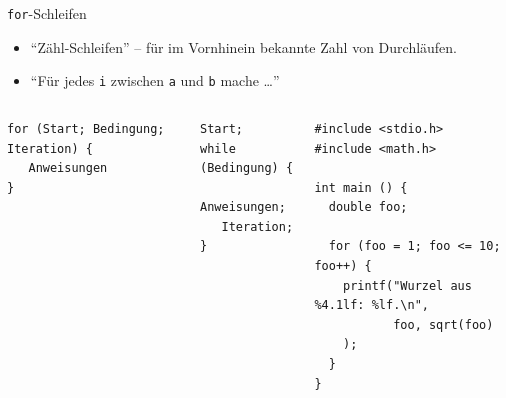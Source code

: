 \begin{frame}[fragile]{\texttt{for}-Schleifen}
%
\begin{itemize}
\item \enquote{Zähl-Schleifen} -- für im Vornhinein bekannte Zahl von Durchläufen.
\item \enquote{Für jedes \texttt{i} zwischen \texttt{a} und \texttt{b} mache \ldots}
\end{itemize}
\vspace{-5pt}
%
\begin{columns}[T]
\begin{codebox}[Syntax]
\begin{verbatim}
for (Start; Bedingung; Iteration) {
   Anweisungen
}
\end{verbatim}
\end{codebox}
%
\begin{codebox}[Umsetzung]
\begin{verbatim}
Start;
while (Bedingung) {
   Anweisungen;
   Iteration;
}
\end{verbatim}
\end{codebox}
%
\begin{codebox}
\begin{verbatim}
#include <stdio.h>
#include <math.h>

int main () {
  double foo;
  
  for (foo = 1; foo <= 10; foo++) {
    printf("Wurzel aus %4.1lf: %lf.\n", 
           foo, sqrt(foo)
    );
  }
}
\end{verbatim}
\end{codebox}
\end{columns}
%
\end{frame}



